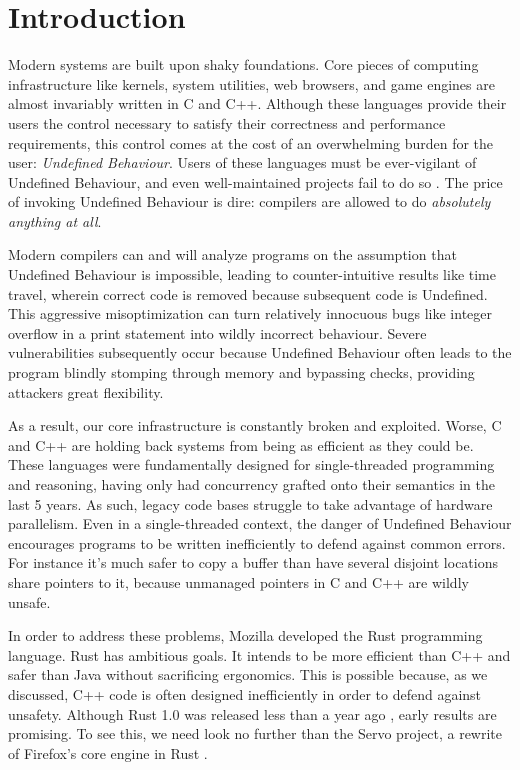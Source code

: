 \chapter{Introduction}
\label{ch:intro}

Modern systems are built upon shaky foundations. Core pieces of computing
infrastructure like kernels, system utilities, web browsers, and game engines
are almost invariably written in C and C++. Although these languages provide
their users the control necessary to satisfy their correctness and performance
requirements, this control comes at the cost of an overwhelming burden for the
user: \emph{Undefined Behaviour}. Users of these languages must be ever-vigilant
of Undefined Behaviour, and even well-maintained projects fail to do so
\cite{wang2012undefined}. The price of invoking Undefined Behaviour is dire:
compilers are allowed to do \emph{absolutely anything at all}.

Modern compilers can and will analyze programs on the assumption that Undefined
Behaviour is impossible, leading to counter-intuitive results like time travel, \cite{timetravel}
wherein correct code is removed because subsequent code is Undefined. This
aggressive misoptimization can turn relatively innocuous bugs like integer
overflow in a print statement into wildly incorrect behaviour. Severe
vulnerabilities subsequently occur because Undefined Behaviour often leads to
the program blindly stomping through memory and bypassing checks, providing attackers
great flexibility.

As a result, our core infrastructure is constantly broken and exploited. Worse,
C and C++ are holding back systems from being as efficient as they could be.
These languages were fundamentally designed for single-threaded programming and
reasoning, having only had concurrency grafted onto their semantics in the last
5 years. As such, legacy code bases struggle to take advantage of hardware
parallelism. Even in a single-threaded context,
the danger of Undefined Behaviour encourages programs to be written
inefficiently to defend against common errors. For instance it's much safer
to copy a buffer than have several disjoint locations share pointers to it,
because unmanaged pointers in C and C++ are wildly unsafe.

In order to address these problems, Mozilla developed the Rust programming language.
Rust has ambitious goals. It intends to be more efficient than C++ and safer
than Java without sacrificing ergonomics. This is possible because, as we discussed,
C++ code is often designed inefficiently in order to defend against unsafety.
Although Rust 1.0 was released less than a year ago \cite{rust1}, early results
are promising. To see this, we need look no further than the Servo project, a
rewrite of Firefox's core engine in Rust
\cite{servo}.

